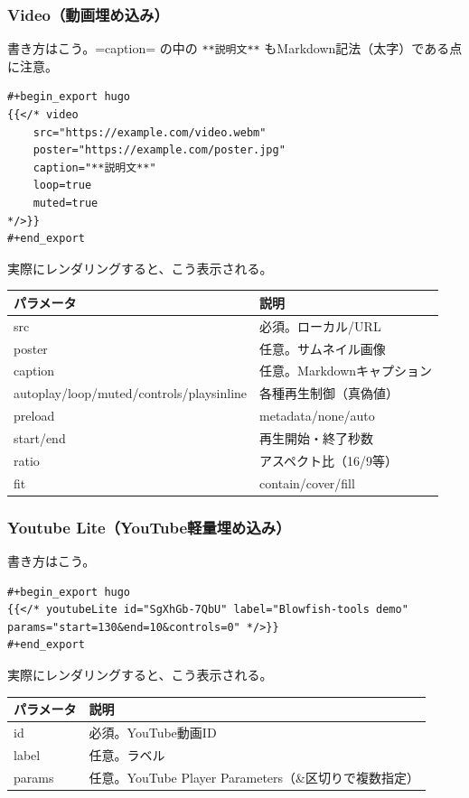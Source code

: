 \documentclass[11pt]{article}
\begin{document}
\subsubsection{Video（動画埋め込み）}
\label{sec:org0ebf5ea}

書き方はこう。=caption= の中の \texttt{**説明文**} もMarkdown記法（太字）である点に注意。

\begin{verbatim}
#+begin_export hugo
{{</* video
    src="https://example.com/video.webm"
    poster="https://example.com/poster.jpg"
    caption="**説明文**"
    loop=true
    muted=true
*/>}}
#+end_export
\end{verbatim}

実際にレンダリングすると、こう表示される。

\begin{center}
\begin{tabular}{ll}
パラメータ & 説明\\
\hline
src & 必須。ローカル/URL\\
poster & 任意。サムネイル画像\\
caption & 任意。Markdownキャプション\\
autoplay/loop/muted/controls/playsinline & 各種再生制御（真偽値）\\
preload & metadata/none/auto\\
start/end & 再生開始・終了秒数\\
ratio & アスペクト比（16/9等）\\
fit & contain/cover/fill\\
\end{tabular}
\end{center}
\subsubsection{Youtube Lite（YouTube軽量埋め込み）}
\label{sec:org8da2595}

書き方はこう。

\begin{verbatim}
#+begin_export hugo
{{</* youtubeLite id="SgXhGb-7QbU" label="Blowfish-tools demo" params="start=130&end=10&controls=0" */>}}
#+end_export
\end{verbatim}

実際にレンダリングすると、こう表示される。

\begin{center}
\begin{tabular}{ll}
パラメータ & 説明\\
\hline
id & 必須。YouTube動画ID\\
label & 任意。ラベル\\
params & 任意。YouTube Player Parameters（\&区切りで複数指定）\\
\end{tabular}
\end{center}
\end{document}
